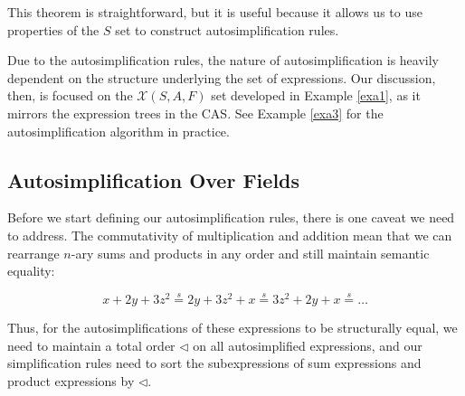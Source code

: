 \documentclass{article}
\theoremstyle{definition}
\begin{document}
This theorem is straightforward, but it is useful because it allows us to use properties of the $S$ set to construct autosimplification rules.

Due to the autosimplification rules, the nature of autosimplification is heavily dependent on the structure underlying the set of expressions. Our discussion, then, is focused on the $\mathcal{X}(S, A, F)$ set developed in Example \ref{exa1}, as it mirrors the expression trees in the CAS. See Example \ref{exa3} for the autosimplification algorithm in practice.

\subsection{Autosimplification Over Fields}

Before we start defining our autosimplification rules, there is one caveat we need to address. The commutativity of multiplication and addition mean that we can rearrange $n$-ary sums and products in any order and still maintain semantic equality:

\begin{equation*}
    x+2y+3z^2 \overset{s}{=} 2y+3z^2+x \overset{s}{=} 3z^2+2y+x \overset{s}{=} \ldots
\end{equation*}

Thus, for the autosimplifications of these expressions to be structurally equal, we need to maintain a total order $\lhd$ on all autosimplified expressions, and our simplification rules need to sort the subexpressions of sum expressions and product expressions by $\lhd$.
\end{document}
